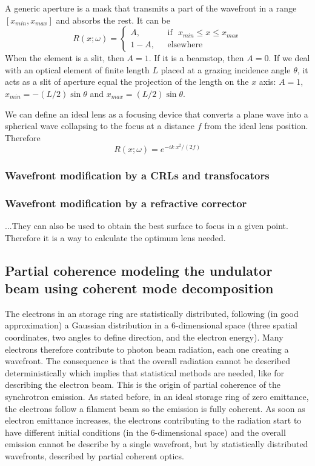 \documentclass{iucr}              %
\begin{document}
A generic aperture is a mask that transmits a part of the wavefront in a range $[x_{min},x_{max}]$ and absorbs the rest. It can be
\begin{equation}
R(x;\omega) =
\left\{
\begin{matrix}
A,  & \mbox{~~if~~} x_{min} \le x \le x_{max}
\\ 
1 - A, & \mbox{~~elsewhere}
\end{matrix}
\right.
\end{equation}
When the element is a slit, then $A=1$. If it is a beamstop, then $A=0$. If we deal with an optical element of finite length $L$ placed at a grazing incidence angle $\theta$, it acts as a slit of aperture equal the projection of the length on the $x$ axis: $A=1$, $x_{min}=-(L/2) \sin \theta$ and $x_{max}=(L/2) \sin \theta$. 

We can define an ideal lens as a focusing device that converts a plane wave into a spherical wave collapsing to the focus at a distance $f$ from the ideal lens position. Therefore
\begin{equation}
    R(x;\omega) = e^{-i k~x^2/(2 f)}
\end{equation}

\subsubsection{Wavefront modification by a CRLs and transfocators}

\subsubsection{Wavefront modification by a refractive corrector}

...They can also be used to obtain the best surface to focus in a given point. Therefore it is a way to calculate the optimum lens needed.  

\subsection{Partial coherence modeling the undulator beam using coherent mode decomposition}

The electrons in an storage ring are statistically distributed, following (in good approximation) a Gaussian distribution in a 6-dimensional space (three spatial coordinates, two angles to define direction, and the electron energy). Many electrons therefore contribute to photon beam radiation, each one creating a wavefront. The consequence is that the overall radiation cannot be described deterministically which implies that statistical methods are needed, like for describing the electron beam. This is the origin of partial coherence of the synchrotron emission. As stated before, in an ideal storage ring of zero emittance, the electrons follow a filament beam so the emission is fully coherent. As soon as  electron emittance increases, the electrons contributing to the radiation start to have different initial conditions (in the 6-dimensional space) and the overall emission cannot be describe by a single wavefront, but by statistically distributed wavefronts, described by partial coherent optics.
\end{document}
